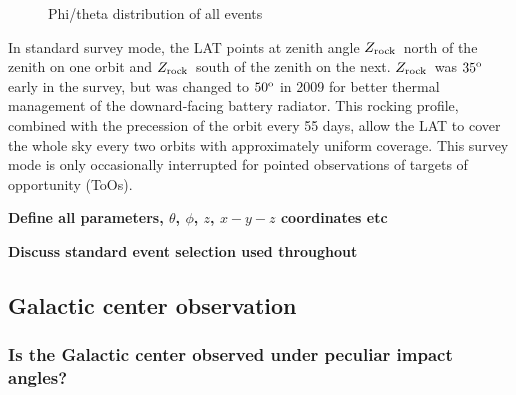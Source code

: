 \documentclass[aps,twocolumn,prd,superscriptaddress,showpacs,nofootinbib,fixfloat]{revtex4}
\newcommand{\degree}{^{\rm o}}
\newcommand{\zrock}{$Z_{\rm rock}$}
\begin{document}
\begin{figure}[h]
  \begin{center}
  \end{center}
  \caption{Phi/theta distribution of all events}
  \label{fig:phiThetaDist}
\end{figure}

In standard survey mode, the LAT points at zenith angle \zrock\ north of the
zenith on one orbit and \zrock\ south of the zenith on the next.  \zrock\ was
$35\degree$ early in the survey, but was changed to $50\degree$ in 2009 for
better thermal management of the downard-facing battery radiator.  This
rocking profile, combined with the precession of the orbit every 55 days,
allow the LAT to cover the whole sky every two orbits with approximately
uniform coverage.  This survey mode is only occasionally interrupted for
pointed observations of targets of opportunity (ToOs). 

\textbf{Define all parameters, $\theta$, $\phi$, $z$, $x-y-z$ coordinates etc}

\textbf{Discuss standard event selection used throughout}

\subsection{Galactic center observation}

\subsubsection{Is the Galactic center observed under peculiar impact angles?}
\end{document}

